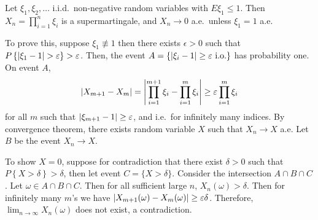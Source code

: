 \documentclass[a4paper]{article}
\begin{document}
\begin{eg}
  Let $\xi_1, \xi_2, \dots$ i.i.d.\ non-negative random variables
  with $E \xi_1 \leq 1$. Then $X_n = \prod_{i=1}^n \xi_i$  
  is a supermartingale, and $X_n \to 0$ a.e.\ unless $\xi_1 = 1$ a.e.

  To prove this,
  suppose $\xi_1 \not\equiv 1$ then there exists $\epsilon > 0$ such that 
  $P \left\{ \left\lvert \xi_1 - 1\right\rvert > \varepsilon \right\} > \varepsilon$.
  Then, the event $A = \{ \left\lvert \xi_i - 1\right\rvert \geq \varepsilon \text{ i.o.} \}$
  has probability one.
  On event $A$,
  \[
  \left\lvert X_{m + 1} - X_m\right\rvert = 
  \left\lvert \prod_{i=1}^{m + 1} \xi_i - \prod_{i=1}^m \xi_i\right\rvert \geq 
  \varepsilon \prod_{i=1}^m \xi_i
  \]
  for all $m$ such that $\left\lvert \xi_{m+1} - 1\right\rvert \geq \varepsilon$, 
  and i.e.\ for infinitely many indices. By convergence theorem,
  there exists random variable $X$ such that $X_n \to X$ a.e. 
  Let $B$ be the event $X_n \to X$. 

  To show $X = 0$, suppose for contradiction that 
  there exist $\delta > 0$ such that $ P \left\{ X > \delta \right\}
  > \delta$, then let event $C = \{ X > \delta \}$. 
  Consider the intersection $A \cap B \cap C$.
  Let $\omega \in A \cap B \cap C$. Then for all sufficient 
  large $n$, $X_n (\omega) > \delta$. Then for infinitely many $m$'s 
  we have $\left\lvert X_{m + 1} (\omega) - X_{m} (\omega)\right\rvert \geq \varepsilon \delta$.
  Therefore, $\lim_{n \to \infty} X_n (\omega)$ does not exist, a 
  contradiction.
  
\end{eg}
\end{document}
